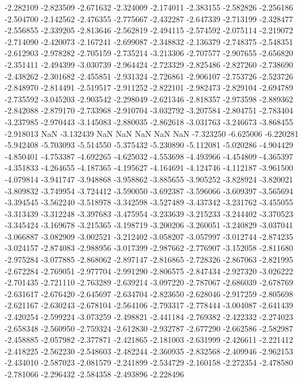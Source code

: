 -2.282109
-2.823509
-2.671632
-2.324009
-2.174011
-2.383155
-2.582826
-2.256186
-2.504700
-2.142562
-2.476355
-2.775667
-2.432287
-2.647339
-2.713199
-2.328477
-2.556855
-2.339205
-2.813646
-2.562819
-2.494115
-2.574592
-2.075114
-2.219072
-2.714090
-2.420073
-2.167241
-2.699087
-2.348832
-2.136379
-2.748375
-2.548351
-2.612903
-2.978282
-2.705159
-2.735214
-3.213306
-2.707577
-2.907655
-2.656820
-2.351411
-2.494399
-3.030739
-2.964424
-2.723329
-2.825486
-2.827260
-2.738690
-2.438262
-2.301682
-2.455851
-2.931324
-2.726861
-2.906107
-2.753726
-2.523726
-2.848970
-2.814491
-2.519517
-2.911252
-2.822101
-2.982473
-2.829104
-2.694789
-2.735592
-3.045203
-2.903542
-2.298049
-2.621346
-2.818357
-2.973598
-2.889362
-2.842088
-2.879170
-2.733968
-2.910704
-3.032792
-3.207584
-2.804751
-2.783404
-3.237985
-2.970443
-3.145083
-2.880035
-2.862618
-3.031763
-3.246673
-3.868455
-2.918013
NaN
-3.132439
NaN
NaN
NaN
NaN
NaN
-7.323250
-6.625006
-6.220281
-5.942408
-5.703093
-5.514550
-5.375432
-5.230890
-5.112081
-5.020286
-4.904429
-4.850401
-4.753387
-4.692265
-4.625032
-4.553698
-4.493966
-4.454809
-4.365397
-4.351833
-4.264655
-4.187365
-4.195627
-4.164691
-4.124746
-4.112187
-3.961500
-4.079814
-3.941747
-3.948868
-3.958862
-3.885655
-3.905252
-3.828924
-3.820021
-3.809832
-3.749954
-3.724412
-3.590050
-3.692387
-3.596066
-3.609397
-3.565694
-3.394545
-3.562240
-3.518978
-3.342598
-3.527489
-3.437342
-3.231762
-3.455055
-3.313439
-3.312248
-3.397683
-3.475954
-3.233639
-3.215233
-3.244402
-3.370523
-3.345424
-3.169678
-3.215365
-3.198719
-3.200206
-3.260051
-3.240829
-3.037041
-3.066887
-3.082909
-3.002521
-3.212402
-3.058207
-3.057997
-3.012744
-2.874235
-3.024157
-2.874083
-2.988956
-3.017399
-2.987662
-2.776907
-3.152058
-2.811680
-2.975284
-3.077885
-2.868062
-2.897147
-2.816865
-2.728326
-2.867063
-2.821995
-2.672284
-2.769051
-2.977704
-2.991290
-2.806575
-2.847434
-2.927320
-3.026222
-2.701435
-2.721110
-2.763289
-2.639214
-3.097220
-2.787067
-2.686039
-2.678769
-2.631617
-2.676420
-2.645697
-2.634704
-2.823650
-2.628046
-2.917259
-2.805698
-2.621167
-2.630243
-2.678104
-2.564106
-2.793317
-2.778444
-3.004087
-2.641439
-2.420254
-2.599224
-3.073259
-2.498821
-2.441184
-2.769382
-2.422332
-2.274023
-2.658348
-2.560950
-2.759324
-2.612830
-2.932787
-2.677290
-2.662586
-2.582987
-2.458885
-2.057982
-2.377871
-2.421865
-2.181003
-2.631999
-2.426611
-2.221412
-2.418225
-2.562230
-2.548603
-2.482244
-2.360935
-2.832568
-2.409946
-2.962153
-2.434010
-2.587023
-2.081579
-2.241899
-2.534729
-2.160158
-2.272354
-2.478580
-2.781066
-2.296432
-2.584358
-2.493896
-2.228496
